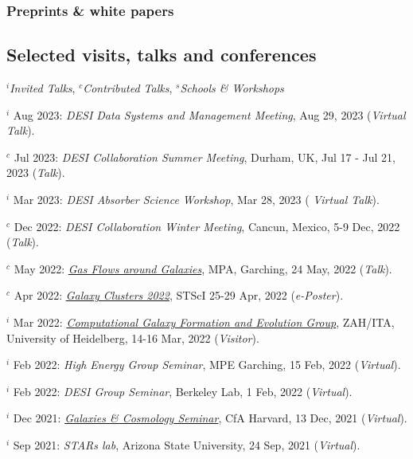 \documentclass[12pt,letterpaper]{article}
\begin{document}
  \subsubsection{Preprints \& white papers}
  \begin{list}{}{\cvlist}
    
  \end{list}
\fi

\subsection{Selected visits, talks and conferences}
$^i$\emph{Invited Talks}, $^c$\emph{Contributed Talks}, $^s$\emph{Schools \& Workshops}
\begin{list}{}{\cvlist}
\item $^i$ Aug 2023:  \emph{DESI Data Systems and Management Meeting}, Aug 29, 2023 (\textit{Virtual Talk}). 
\item $^c$ Jul 2023:  \emph{DESI Collaboration Summer Meeting}, Durham, UK, Jul 17 - Jul 21, 2023 (\textit{Talk}). 
\item $^i$ Mar 2023:  \emph{DESI Absorber Science Workshop}, Mar 28, 2023 (\textit{ Virtual Talk}).   
\item $^c$ Dec 2022:  \emph{DESI Collaboration Winter Meeting}, Cancun, Mexico, 5-9 Dec, 2022 (\textit{Talk}).   
\item $^c$ May 2022:  \emph{\href{https://indico.ph.tum.de/event/7018/}{Gas Flows around Galaxies}}, MPA, Garching, 24 May, 2022 (\textit{Talk}).   
\item $^c$ Apr 2022:  \emph{\href{https://www.stsci.edu/contents/events/stsci/2022/april/galaxy-clusters-2022-challenging-our-cosmological-perspectives}{Galaxy Clusters 2022}}, STScI 25-29 Apr, 2022 (\textit{e-Poster}).   
\item $^i$ Mar 2022:  \emph{\href{https://zah.uni-heidelberg.de/research-groups\#c2659}{Computational Galaxy Formation and Evolution Group}}, ZAH/ITA, University of Heidelberg, 14-16 Mar, 2022 (\textit{Visitor}).   
\item $^i$ Feb 2022:  \emph{High Energy Group Seminar}, MPE Garching, 15 Feb, 2022 (\textit{Virtual}).   
\item $^i$ Feb 2022:  \emph{DESI Group Seminar}, Berkeley Lab, 1 Feb, 2022 (\textit{Virtual}).   
\item $^i$ Dec 2021:  \emph{\href{https://pweb.cfa.harvard.edu/calendar/event/9298}{Galaxies \& Cosmology Seminar}}, CfA Harvard, 13 Dec, 2021 (\textit{Virtual}).   
\item $^i$ Sep 2021:  \textit{STARs lab}, Arizona State University, 24 Sep, 2021 (\textit{Virtual}).   


\end{list}
\end{document}

